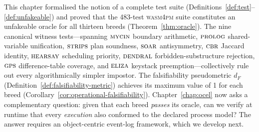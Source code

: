 This chapter formalised the notion of a complete test suite
(Definitions~\ref{def:test}--\ref{def:unfakeable}) and proved that the
483-test \textsc{wasm4pm} suite constitutes an unfakeable oracle for all
thirteen breeds (Theorem~\ref{thm:oracle}).  The nine canonical witness
tests---spanning $\textsc{mycin}$ boundary arithmetic, $\textsc{prolog}$ shared-variable
unification, $\textsc{strips}$ plan soundness, $\textsc{soar}$ antisymmetry, $\textsc{cbr}$ Jaccard
identity, $\textsc{hearsay}$ scheduling priority, $\textsc{dendral}$ forbidden-substructure
rejection, $\textsc{gps}$ difference-table coverage, and $\textsc{eliza}$ keystack
preemption---collectively rule out every algorithmically simpler impostor.
The falsifiability pseudometric $d_F$ (Definition~\ref{def:falsifiability-metric})
achieves its maximum value of 1 for each breed (Corollary~\ref{cor:operational-falsifiability}).
Chapter~\ref{chap:ocel} now asks a complementary question: given that each
breed \emph{passes} its oracle, can we verify at runtime that every
\emph{execution} also conformed to the declared process model?  The answer
requires an object-centric event-log framework, which we develop next.
